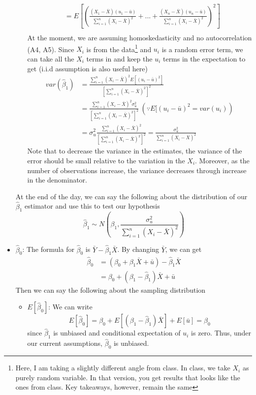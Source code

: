 \documentclass[12pt]{article}
\theoremstyle{definition}
\theoremstyle{property}
\theoremstyle{assumption}
\theoremstyle{example}
\theoremstyle{comment}
\begin{document}
\begin{itemize}
\begin{itemize}
\[\begin{aligned}
&=E\left[\left(  \frac{(X_1-\bar{X})(u_1-\bar{u})}{\sum_{i=1}^n(X_i-\bar{X})^2}+...+\frac{(X_n-\bar{X})(u_n-\bar{u})}{\sum_{i=1}^n(X_i-\bar{X})^2} \right)^2\right]\\
\end{aligned}
\]
At the moment, we are assuming homoskedasticity and no autocorrelation (A4, A5). Since $X_i$ is from the data\footnote{Here, I am taking a slightly different angle from class. In class, we take $X_i$ as purely random variable. In that version, you get results that looks like the ones from class. Key takeaways, however, remain the same} and $u_i$ is a random error term, we can take all the $X_i$ terms in and keep the $u_i$ terms in the expectation to get (i.i.d assumption is also useful here)
\[
\begin{aligned}
var(\hat{\beta}_1)&=\frac{\sum_{i=1}^n(X_i-\bar{X})^2E[(u_i-\bar{u})^2]}{[\sum_{i=1}^n(X_i-\bar{X})^2]^2}\\
&=\frac{\sum_{i=1}^n(X_i-\bar{X})^2\sigma_u^2}{[\sum_{i=1}^n(X_i-\bar{X})^2]^2} \ (\because E[(u_i-\bar{u})^2=var(u_i))\\
&=\sigma_u^2\frac{\sum_{i=1}^n(X_i-\bar{X})^2}{[\sum_{i=1}^n(X_i-\bar{X})^2]^2} =\frac{\sigma_u^2}{\sum_{i=1}^n(X_i-\bar{X})^2}
\end{aligned}
\]
Note that  to decrease the variance in the estimates, the variance of the error should be small relative to the variation in the $X_i$. Moreover, as the number of observations increase, the variance decreases through increase in the denominator.
\end{itemize}
At the end of the day, we can say the following about the distribution of our $\hat{\beta}_1$ estimator and use this to test our hypothesis
\[
\hat{\beta}_1 \sim N\left(\beta_1, \frac{\sigma_u^2}{\sum_{i=1}^n(X_i-\bar{X})^2}\right)
\]
\item $\hat{\beta}_0$: The formula for $\hat{\beta}_0$ is $\bar{Y}-\hat{\beta}_1\bar{X}$. By changing $\bar{Y}$, we can get
\[
\begin{aligned}
\hat{\beta}_0&=(\beta_0+\beta_1\bar{X}+\bar{u})-\hat{\beta}_1\bar{X}\\
&=\beta_0+(\beta_1-\hat{\beta}_1)\bar{X}+\bar{u}
\end{aligned}
\]
Then we can say the following about the sampling distribution
\begin{itemize}
\item $E[\hat{\beta}_0]$: We can write
\[
E[\hat{\beta}_0]=\beta_0+E[(\beta_1-\hat{\beta}_1)\bar{X}]+E[\bar{u}]=\beta_0
\]
since $\hat{\beta}_1$ is unbiased and conditional expectation of $u_i$ is zero. Thus, under our current assumptions, $\hat{\beta}_0$ is unbiased. 

\end{itemize}
\end{itemize}
\end{document}

